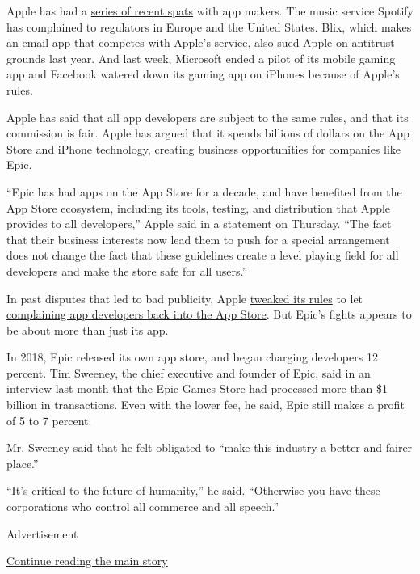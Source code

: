 Apple has had a
\href{https://www.nytimes3xbfgragh.onion/2020/08/07/technology/facebook-apple-gaming-app-store.html}{series
of recent spats} with app makers. The music service Spotify has
complained to regulators in Europe and the United States. Blix, which
makes an email app that competes with Apple's service, also sued Apple
on antitrust grounds last year. And last week, Microsoft ended a pilot
of its mobile gaming app and Facebook watered down its gaming app on
iPhones because of Apple's rules.

Apple has said that all app developers are subject to the same rules,
and that its commission is fair. Apple has argued that it spends
billions of dollars on the App Store and iPhone technology, creating
business opportunities for companies like Epic.

``Epic has had apps on the App Store for a decade, and have benefited
from the App Store ecosystem, including its tools, testing, and
distribution that Apple provides to all developers,'' Apple said in a
statement on Thursday. ``The fact that their business interests now lead
them to push for a special arrangement does not change the fact that
these guidelines create a level playing field for all developers and
make the store safe for all users.''

In past disputes that led to bad publicity, Apple
\href{https://www.nytimes3xbfgragh.onion/2019/06/03/technology/apple-parental-control-apps.html}{tweaked
its rules} to let
\href{https://www.theverge.com/2020/6/22/21298552/apple-hey-email-app-approval-rules-basecamp-launch}{complaining
app developers back into the App Store}. But Epic's fights appears to be
about more than just its app.

In 2018, Epic released its own app store, and began charging developers
12 percent. Tim Sweeney, the chief executive and founder of Epic, said
in an interview last month that the Epic Games Store had processed more
than \$1 billion in transactions. Even with the lower fee, he said, Epic
still makes a profit of 5 to 7 percent.

Mr. Sweeney said that he felt obligated to ``make this industry a better
and fairer place.''

``It's critical to the future of humanity,'' he said. ``Otherwise you
have these corporations who control all commerce and all speech.''

Advertisement

\protect\hyperlink{after-bottom}{Continue reading the main story}

